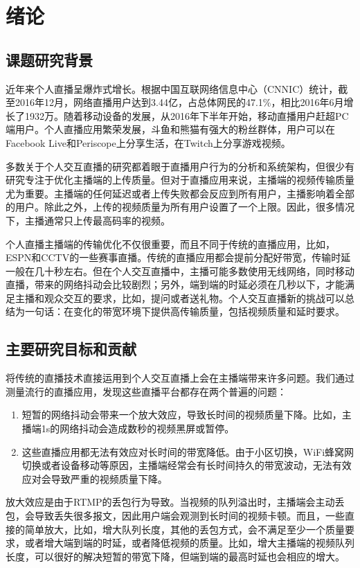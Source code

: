 \chapter{绪论}
\label{cha:intro}

\section{课题研究背景}
近年来个人直播呈爆炸式增长。根据中国互联网络信息中心（CNNIC）统计，截至2016年12月，网络直播用户达到3.44亿，占总体网民的47.1\%，相比2016年6月增长了1932万。随着移动设备的发展，从2016年下半年开始，移动直播用户赶超PC端用户。个人直播应用繁荣发展，斗鱼和熊猫有强大的粉丝群体，用户可以在Facebook Live和Periscope上分享生活，在Twitch上分享游戏视频。

多数关于个人交互直播的研究都着眼于直播用户行为的分析和系统架构，但很少有研究专注于优化主播端的上传质量。但对于直播应用来说，主播端的视频传输质量尤为重要。主播端的任何延迟或者上传失败都会反应到所有用户，主播影响着全部的用户。除此之外，上传的视频质量为所有用户设置了一个上限。因此，很多情况下，主播通常只上传最高码率的视频。

个人直播主播端的传输优化不仅很重要，而且不同于传统的直播应用，比如，ESPN和CCTV的一些赛事直播。传统的直播应用都会提前分配好带宽，传输时延一般在几十秒左右。但在个人交互直播中，主播可能多数使用无线网络，同时移动直播，带来的网络抖动会比较剧烈；另外，端到端的时延必须在几秒以下，才能满足主播和观众交互的要求，比如，提问或者送礼物。个人交互直播新的挑战可以总结为一句话：在变化的带宽环境下提供高传输质量，包括视频质量和延时要求。
\section{主要研究目标和贡献}
将传统的直播技术直接运用到个人交互直播上会在主播端带来许多问题。我们通过测量流行的直播应用，发现这些直播平台都存在两个普遍的问题：
\begin{enumerate}
  \item 短暂的网络抖动会带来一个放大效应，导致长时间的视频质量下降。比如，主播端1s的网络抖动会造成数秒的视频黑屏或暂停。
  \item 这些直播应用都无法有效应对长时间的带宽降低。由于小区切换，WiFi蜂窝网切换或者设备移动等原因，主播端经常会有长时间持久的带宽波动，无法有效应对会导致严重的视频质量下降。
\end{enumerate}

放大效应是由于RTMP的丢包行为导致。当视频的队列溢出时，主播端会主动丢包，会导致丢失很多报文，因此用户端会观测到长时间的视频卡顿。而且，一些直接的简单放大，比如，增大队列长度，其他的丢包方式，会不满足至少一个质量要求，或者增大端到端的时延，或者降低视频的质量。比如，增大主播端的视频队列长度，可以很好的解决短暂的带宽下降，但端到端的最高时延也会相应的增大。

